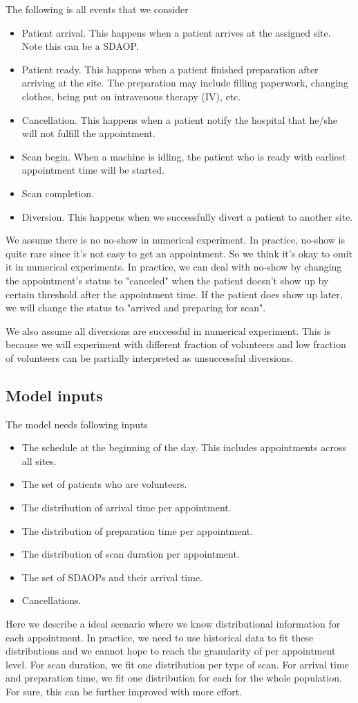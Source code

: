 The following is all events that we consider
\begin{itemize}
\item Patient arrival. This happens when a patient arrives at
      the assigned site. Note this can be a SDAOP.
\item Patient ready. This happens when a patient finished preparation
      after arriving at the site. The preparation may include filling
      paperwork, changing clothes, being put on intravenous therapy (IV),
      etc.
\item Cancellation. This happens when a patient notify the hospital
      that he/she will not fulfill the appointment.
\item Scan begin. When a machine is idling, the patient who is ready
      with earliest appointment time will be started.
\item Scan completion.
\item Diversion. This happens when we successfully divert a patient
      to another site. 
\end{itemize}
We assume there is no no-show in numerical experiment. In practice,
no-show is quite rare since it's not easy to get an appointment. So we think it's
okay to omit it in numerical experiments. In practice, we can deal
with no-show by changing the appointment's status to "canceled"
when the patient doesn't show up by certain threshold after
the appointment time. If the patient does show up later, we will
change the status to "arrived and preparing for scan".

We also assume all diversions are successful in numerical experiment.
This is because we will experiment with different fraction of volunteers
and low fraction of volunteers can be partially interpreted as
unsuccessful diversions.

\subsection{Model inputs}

The model needs following inputs
\begin{itemize}
\item The schedule at the beginning of the day. This includes
      appointments across all sites.
\item The set of patients who are volunteers.
\item The distribution of arrival time per appointment.
\item The distribution of preparation time per appointment.
\item The distribution of scan duration per appointment.
\item The set of SDAOPs and their arrival time.
\item Cancellations.
\end{itemize}
Here we describe a ideal scenario where we know distributional
information for each appointment. In practice, we need to
use historical data to fit these distributions and we cannot
hope to reach the granularity of per appointment level.
For scan duration, we fit one distribution per type of scan.
For arrival time and preparation time, we fit one distribution
for each for the whole population. For sure, this can be further
improved with more effort.

